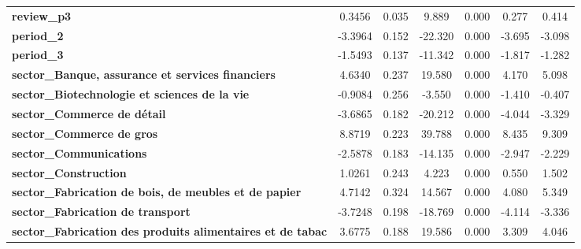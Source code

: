 \begin{center}
\begin{tabular}{lcccccc}
\textbf{review\_p3}                                                   &       0.3456  &        0.035     &     9.889  &         0.000        &        0.277    &        0.414     \\
\textbf{period\_2}                                                    &      -3.3964  &        0.152     &   -22.320  &         0.000        &       -3.695    &       -3.098     \\
\textbf{period\_3}                                                    &      -1.5493  &        0.137     &   -11.342  &         0.000        &       -1.817    &       -1.282     \\
\textbf{sector\_Banque, assurance et services financiers}             &       4.6340  &        0.237     &    19.580  &         0.000        &        4.170    &        5.098     \\
\textbf{sector\_Biotechnologie et sciences de la vie}                 &      -0.9084  &        0.256     &    -3.550  &         0.000        &       -1.410    &       -0.407     \\
\textbf{sector\_Commerce de détail}                                   &      -3.6865  &        0.182     &   -20.212  &         0.000        &       -4.044    &       -3.329     \\
\textbf{sector\_Commerce de gros}                                     &       8.8719  &        0.223     &    39.788  &         0.000        &        8.435    &        9.309     \\
\textbf{sector\_Communications}                                       &      -2.5878  &        0.183     &   -14.135  &         0.000        &       -2.947    &       -2.229     \\
\textbf{sector\_Construction}                                         &       1.0261  &        0.243     &     4.223  &         0.000        &        0.550    &        1.502     \\
\textbf{sector\_Fabrication de bois, de meubles et de papier}         &       4.7142  &        0.324     &    14.567  &         0.000        &        4.080    &        5.349     \\
\textbf{sector\_Fabrication de transport}                             &      -3.7248  &        0.198     &   -18.769  &         0.000        &       -4.114    &       -3.336     \\
\textbf{sector\_Fabrication des produits alimentaires et de tabac}    &       3.6775  &        0.188     &    19.586  &         0.000        &        3.309    &        4.046     \\

\end{tabular}
\end{center}
